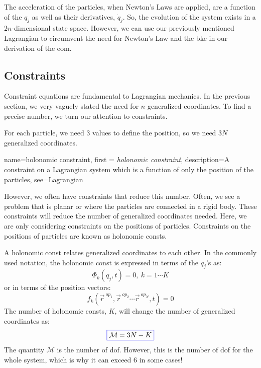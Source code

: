 \documentclass[12pt]{report}
\begin{document}
The acceleration of the particles, when Newton's Laws are applied, are a function of the $q_j$ as well as their derivatives, $\dot{q}_j$. So, the evolution of the system exists in a $2n$-dimensional state space. However, we can use our previously mentioned \gls{Lagrangian} to circumvent the need for Newton's Law and the \gls{bke} in our derivation of the \gls{eom}.

\subsection{Constraints}\label{sec:constaints}
Constraint equations are fundamental to \gls{Lagrangian} mechanics. In the previous section, we very vaguely stated the need for $n$ generalized coordinates. To find a precise number, we turn our attention to constraints.

For each particle, we need 3 values to define the position, so we need $3N$ generalized coordinates. 

{
    name=holonomic constraint,
    first = {\textit{holonomic constraint}},
    description={A constraint on a Lagrangian system which is a function of only the position of the particles},
    see={Lagrangian}
}

However, we often have constraints that reduce this number. Often, we see a problem that is planar or where the particles are connected in a \gls{rigid body}. These constraints will reduce the number of generalized coordinates needed. Here, we are only considering constraints on the positions of particles. Constraints on the positions of particles are known as \glspl{holonomic const}. 

A \gls{holonomic const} relates generalized coordinates to each other. In the commonly used notation, the \gls{holonomic const} is expressed in terms of the $q_j$'s as:
$$\Phi_k\left(q_j,t\right)=0, \ k=1\cdots K$$
or in terms of the position vectors:
$$f_k\left(\vec{r}^{\ op_1},\vec{r}^{\ op_2}\cdots \vec{r}^{\ op_N},t\right)=0$$
The number of \glspl{holonomic const}, $K$, will change the number of generalized coordinates as:
\begin{gather}\label{eq:dof}
\color{blue}\boxed{\color{black}\mathcal{M}=3N-K}\color{black}
\end{gather}
The quantity $\mathcal{M}$ is the number of \gls{dof}. However, this is the number of \gls{dof} for the whole system, which is why it can exceed 6 in some cases!
\end{document}
